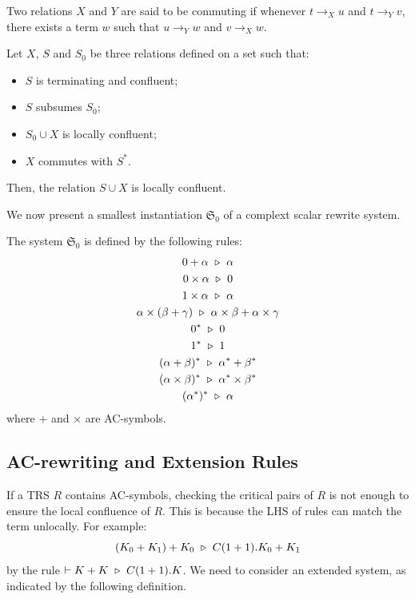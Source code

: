 \begin{definition}
  Two relations $X$ and $Y$ are said to be commuting if whenever $t \to_X u$ and $t \to_Y v$, there exists a term $w$ such that $u \to_Y w$ and $v \to_X w$.
\end{definition}

\begin{proposition} \cite{Arrighi2005} Let $X$, $S$ and $S_0$ be three relations defined on a set such that:
  \begin{itemize}
    \item $S$ is terminating and confluent;
    \item $S$ subsumes $S_0$;
    \item $S_0 \cup X$ is locally confluent;
    \item $X$ commutes with $S^*$.
  \end{itemize}
  Then, the relation $S \cup X$ is locally confluent.
\end{proposition}

We now present a smallest instantiation $\mathfrak{S}_0$ of a complext scalar rewrite system. 

\begin{definition}
  The system $\mathfrak{S}_0$ is defined by the following rules:
  \begin{gather*}
    0 + \alpha \ \triangleright\  \alpha\\
    0 \times \alpha \ \triangleright\  0\\
    1 \times \alpha \ \triangleright\  \alpha\\
    \alpha \times (\beta + \gamma) \ \triangleright\  \alpha \times \beta + \alpha \times \gamma\\
    0^* \ \triangleright\  0 \\
    1^* \ \triangleright\  1 \\
    (\alpha + \beta)^* \ \triangleright\  \alpha^* + \beta^*\\
    (\alpha \times \beta)^* \ \triangleright\  \alpha^* \times \beta^*\\
    (\alpha^*)^* \ \triangleright\  \alpha
  \end{gather*}
  where $+$ and $\times$ are AC-symbols.
\end{definition}


\subsection{AC-rewriting and Extension Rules}
If a TRS $R$ contains AC-symbols, checking the critical pairs of $R$ is not enough to ensure the local confluence of $R$. This is because the LHS of rules can match the term unlocally. For example:
$$
(K_0 + K_1) + K_0 \ \triangleright\  C(1 + 1).K_0 + K_1
$$
by the rule $\vdash K + K \ \triangleright\  C(1 + 1).K$. We need to consider an extended system, as indicated by the following definition.

